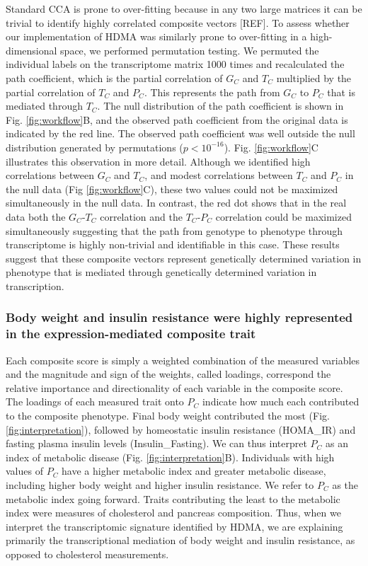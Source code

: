 \documentclass[
]{article}
\begin{document}
Standard CCA is prone to over-fitting because in any two large matrices
it can be trivial to identify highly correlated composite vectors
{[}REF{]}. To assess whether our implementation of HDMA was similarly
prone to over-fitting in a high-dimensional space, we performed
permutation testing. We permuted the individual labels on the
transcriptome matrix 1000 times and recalculated the path coefficient,
which is the partial correlation of \(G_C\) and \(T_C\) multiplied by
the partial correlation of \(T_C\) and \(P_C\). This represents the path
from \(G_C\) to \(P_C\) that is mediated through \(T_C\). The null
distribution of the path coefficient is shown in Fig.
\ref{fig:workflow}B, and the observed path coefficient from the original
data is indicated by the red line. The observed path coefficient was
well outside the null distribution generated by permutations
(\(p < 10^{-16}\)). Fig. \ref{fig:workflow}C illustrates this
observation in more detail. Although we identified high correlations
between \(G_C\) and \(T_C\), and modest correlations between \(T_C\) and
\(P_C\) in the null data (Fig \ref{fig:workflow}C), these two values
could not be maximized simultaneously in the null data. In contrast, the
red dot shows that in the real data both the \(G_C\)-\(T_C\) correlation
and the \(T_C\)-\(P_C\) correlation could be maximized simultaneously
suggesting that the path from genotype to phenotype through
transcriptome is highly non-trivial and identifiable in this case. These
results suggest that these composite vectors represent genetically
determined variation in phenotype that is mediated through genetically
determined variation in transcription.

\subsubsection{Body weight and insulin resistance were highly
represented in the expression-mediated composite
trait}\label{body-weight-and-insulin-resistance-were-highly-represented-in-the-expression-mediated-composite-trait}

Each composite score is simply a weighted combination of the measured
variables and the magnitude and sign of the weights, called loadings,
correspond the relative importance and directionality of each variable
in the composite score. The loadings of each measured trait onto \(P_C\)
indicate how much each contributed to the composite phenotype. Final
body weight contributed the most (Fig. \ref{fig:interpretation}),
followed by homeostatic insulin resistance (HOMA\_IR) and fasting plasma
insulin levels (Insulin\_Fasting). We can thus interpret \(P_C\) as an
index of metabolic disease (Fig. \ref{fig:interpretation}B). Individuals
with high values of \(P_C\) have a higher metabolic index and greater
metabolic disease, including higher body weight and higher insulin
resistance. We refer to \(P_C\) as the metabolic index going forward.
Traits contributing the least to the metabolic index were measures of
cholesterol and pancreas composition. Thus, when we interpret the
transcriptomic signature identified by HDMA, we are explaining primarily
the transcriptional mediation of body weight and insulin resistance, as
opposed to cholesterol measurements.
\end{document}

